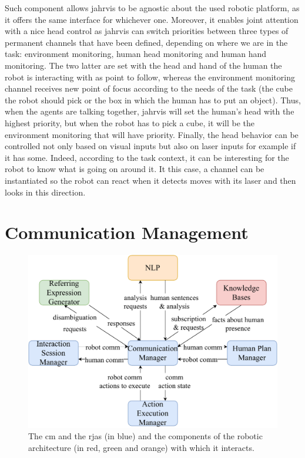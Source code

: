 \documentclass[a4paper,11pt,twoside]{StyleThese}
\begin{document}
Such component allows \acrshort{jahrvis} to be agnostic about the used robotic platform, as it offers the same interface for whichever one. Moreover, it enables joint attention with a nice head control as \acrshort{jahrvis} can switch priorities between three types of permanent channels that have been defined, depending on where we are in the task: environment monitoring, human head monitoring and human hand monitoring. The two latter are set with the head and hand of the human the robot is interacting with as point to follow, whereas the environment monitoring channel receives new point of focus according to the needs of the task (\eg the cube the robot should pick or the box in which the human has to put an object). Thus, when the agents are talking together, \acrshort{jahrvis} will set the human's head with the highest priority, but when the robot has to pick a cube, it will be the environment monitoring that will have priority. Finally, the head behavior can be controlled not only based on visual inputs but also on laser inputs for example if it has some. Indeed, according to the task context, it can be interesting for the robot to know what is going on around it. It this case, a channel can be instantiated so the robot can react when it detects moves with its laser and then looks in this direction.

\section{Communication Management}\label{chap6:sec:comm}

\begin{figure}[!hbt]
	\centering
	\includegraphics[width=0.85\linewidth]{figures/chapter2/comm_manager_zoom.pdf}
	\caption{The \acrlong{cm} and the \acrshort{rja}s (in blue) and the components of the robotic architecture (in red, green and orange) with which it interacts.}
	\label{chap6:fig:comm_manager_zoom}
\end{figure}
\end{document}

